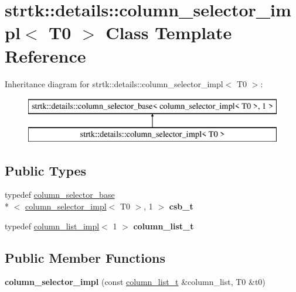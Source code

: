 \hypertarget{classstrtk_1_1details_1_1column__selector__impl_3_01T0_01_4}{\section{strtk\-:\-:details\-:\-:column\-\_\-selector\-\_\-impl$<$ T0 $>$ Class Template Reference}
\label{classstrtk_1_1details_1_1column__selector__impl_3_01T0_01_4}
}
Inheritance diagram for strtk\-:\-:details\-:\-:column\-\_\-selector\-\_\-impl$<$ T0 $>$\-:\begin{figure}[H]
\begin{center}
\leavevmode
\includegraphics[height=2.000000cm]{classstrtk_1_1details_1_1column__selector__impl_3_01T0_01_4}
\end{center}
\end{figure}
\subsection*{Public Types}
\begin{DoxyCompactItemize}
\item 
\hypertarget{classstrtk_1_1details_1_1column__selector__impl_3_01T0_01_4_af8bba70ca4f43633c82136b7b7799d86}{typedef \hyperlink{classstrtk_1_1details_1_1column__selector__base}{column\-\_\-selector\-\_\-base}\\*
$<$ \hyperlink{classstrtk_1_1details_1_1column__selector__impl}{column\-\_\-selector\-\_\-impl}$<$ T0 $>$, 1 $>$ {\bfseries csb\-\_\-t}}\label{classstrtk_1_1details_1_1column__selector__impl_3_01T0_01_4_af8bba70ca4f43633c82136b7b7799d86}

\item 
\hypertarget{classstrtk_1_1details_1_1column__selector__impl_3_01T0_01_4_a46c8c756ce2c861b489e4ac855676bbb}{typedef \hyperlink{structstrtk_1_1details_1_1column__list__impl}{column\-\_\-list\-\_\-impl}$<$ 1 $>$ {\bfseries column\-\_\-list\-\_\-t}}\label{classstrtk_1_1details_1_1column__selector__impl_3_01T0_01_4_a46c8c756ce2c861b489e4ac855676bbb}

\end{DoxyCompactItemize}
\subsection*{Public Member Functions}
\begin{DoxyCompactItemize}
\item 
\hypertarget{classstrtk_1_1details_1_1column__selector__impl_3_01T0_01_4_a8cb302318ba6880b0c1331823eacd828}{{\bfseries column\-\_\-selector\-\_\-impl} (const \hyperlink{structstrtk_1_1details_1_1column__list__impl}{column\-\_\-list\-\_\-t} \&column\-\_\-list, T0 \&t0)}\label{classstrtk_1_1details_1_1column__selector__impl_3_01T0_01_4_a8cb302318ba6880b0c1331823eacd828}

\end{DoxyCompactItemize}

